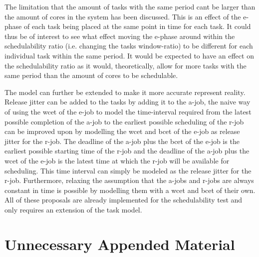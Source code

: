 \documentclass{kththesis}
\begin{document}
The limitation that the amount of tasks with the same period cant be larger than the amount of cores
in the system has been discussed. This is an effect of the \acrshort{e}-phase of each task being
placed at the same point in time for each task. It could thus be of interest to see what effect
moving the \acrshort{e}-phase around within the schedulability ratio (i.e. changing the tasks
window-ratio) to be different for each individual task within the same period. It would be expected
to have an effect on the schedulability ratio as it would, theoretically, allow for more tasks with
the same period than the amount of cores to be schedulable.

The model can further be extended to make it more accurate represent reality. Release jitter can be
added to the tasks by adding it to the \acrshort{a}-job, the naive way of using the \acrshort{wcet}
of the \acrshort{e}-job to model the time-interval required from the latest possible completion of
the \acrshort{a}-job to the earliest possible scheduling of the \acrshort{r}-job can be improved
upon by modelling the \acrshort{wcet} and \acrshort{bcet} of the \acrshort{e}-job as release jitter
for the \acrshort{r}-job. The deadline of the \acrshort{a}-job plus the \acrshort{bcet} of the
\acrshort{e}-job is the earliest possible starting time of the \acrshort{r}-job and the deadline of
the \acrshort{a}-job plus the \acrshort{wcet} of the \acrshort{e}-job is the latest time at which
the \acrshort{r}-job will be available for scheduling. This time interval can simply be modeled as
the release jitter for the \acrshort{r}-job. Furthermore, relaxing the assumption that the
\acrshort{a}-jobs and \acrshort{r}-jobs are always constant in time is possible by modelling them
with a \acrshort{wcet} and \acrshort{bcet} of their own. All of these proposals are already
implemented for the schedulability test and only requires an extension of the task model.


\printbibliography[heading=bibintoc] 

\appendix

\chapter{Unnecessary Appended Material}
\end{document}
